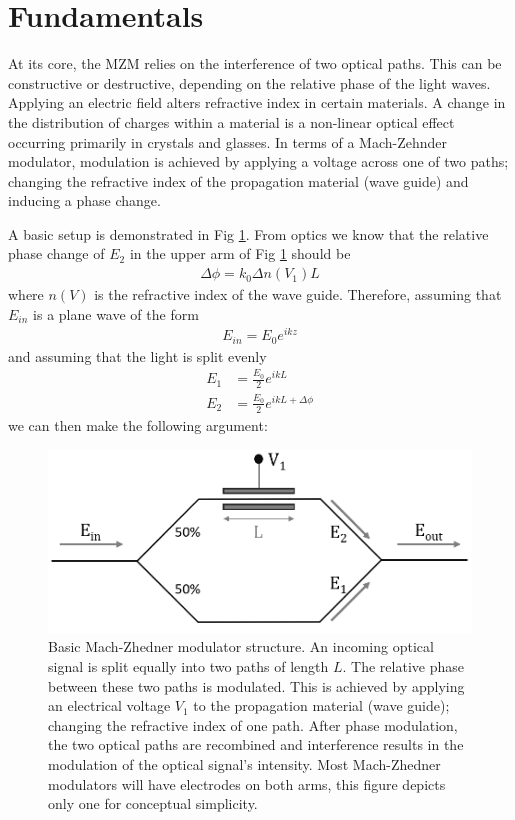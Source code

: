 \documentclass[12pt,a4paper]{report}
\begin{document}
\section{Fundamentals}
At its core, the MZM relies on the interference of two optical paths. This can be constructive or destructive, depending on the relative phase of the light waves. Applying an electric field alters refractive index in certain materials. A change in the distribution of charges within a material is a non-linear optical effect occurring primarily in crystals and glasses. In terms of a Mach-Zehnder modulator, modulation is achieved by applying a voltage across one of two paths; changing the refractive index of the propagation material (wave guide) and inducing a phase change.

A basic setup is demonstrated in Fig \ref{fig-mach}. From optics we know that the relative phase change of $E_2$ in the upper arm of Fig \ref{fig-mach} should be 
\begin{align*}
    \Delta\phi = k_0 \Delta n(V_1)L
\end{align*}
where $n(V)$ is the refractive index of the wave guide. Therefore, assuming that $E_{in}$ is a plane wave of the form
\begin{align*}
    E_{in} = E_0e^{ikz}
\end{align*}
and assuming that the light is split evenly 
\begin{align*}
    E_{1} &= \frac{E_0}{2}e^{ikL} \\
    E_{2} &= \frac{E_0}{2}e^{ikL + \Delta\phi}
\end{align*}
we can then make the following argument:
\begin{figure}
\centering
\includegraphics[width=0.7\columnwidth]{mach-zhen.png} 
\caption{Basic Mach-Zhedner modulator structure. An incoming optical signal is split equally into two paths of length $L$. The relative phase between these two paths is modulated. This is achieved by applying an electrical voltage $V_{1}$ to the propagation material (wave guide); changing the refractive index of one path. After phase modulation, the two optical paths are recombined and interference results in the modulation of the optical signal's intensity. Most Mach-Zhedner modulators will have electrodes on both arms, this figure depicts only one for conceptual simplicity.}
\label{fig-mach}
\end{figure}
\end{document}
